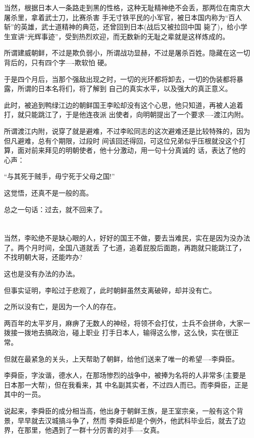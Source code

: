 \documentclass[11pt,a4paper,onecolumn]{article}
\begin{document}
当然，根据日本人一条路走到黑的性格，这种无耻精神绝不会丢，那两位在南京大屠杀里，拿着武士刀，比赛杀害
手无寸铁平民的小军官，被日本国内称为``百人斩''的英雄，武士道精神的典范，还曾回到日本(战后又被拉回中国
毙了)，给小学生宣讲``光辉事迹''，受到热烈欢迎，而无数新的无耻之辈就是这样炼成的。

所谓建威朝鲜，不过是欺负弱小，所谓战功显赫，不过是屠杀百姓。隐藏在这一切背后的，只有四个字----欺软怕
硬。

于是四个月后，当那个强敌出现之时，一切的光环都将卸去，一切的伪装都将暴露，所谓的日本名将们，将了解到
自己的真实水平，以及强大的真正意义。

此时，被追到鸭绿江边的朝鲜国王李昖却没有这个心思，他只知道，再被人追着打，就只能跳江了，于是他连夜派
出使者，向明朝提出了一个要求----渡江内附。

所谓渡江内附，说穿了就是避难，不过李昖同志的这次避难还是比较特殊的，因为但凡避难，总有个期限，过段时
间该回还得回，可这位兄弟似乎压根就没这个打算，面对前来拜见的明朝使者，他十分激动，用一句十分真诚的
话，表达了他的心声：

``与其死于贼手，毋宁死于父母之国!''

这觉悟，还真不是一般的高。

总之一句话：过去，就不回来了。

\section[\thesection]{}

当然，李昖绝不是缺心眼的人，好好的国王不做，要去当难民，实在是因为没办法了。两个月时间，全国八道就丢
了七道，追着屁股后面跑，再跑就只能跳江了，不找明朝大哥，还能咋办?

这也是没有办法的办法。

但事实证明，李昖过于悲观了，此时朝鲜虽然支离破碎，却并没有亡。

之所以没有亡，是因为一个人的存在。

两百年的太平岁月，麻痹了无数人的神经，将领不会打仗，士兵不会拼命，大家一拨接一拨地去搞政治，碰上职业
打手日本人，输得这么惨，这么快，实在很正常。

但就在最紧急的关头，上天帮助了朝鲜，给他们送来了唯一的希望----李舜臣。

李舜臣，字汝谐，德水人，在那场惨烈的战争中，被捧为名将的人非常多(主要是日本那一大帮)，但在我看来，其
中名副其实者，不过四人而已。而李舜臣，正是其中的一员。

说起来，李舜臣的成分相当高，他出身于朝鲜王族，是王室宗亲，一般有这个背景，早早就去汉城搞斗争了，然而
李舜臣却是个例外，他武科毕业后，就去了边界，在那里，他遇到了一群十分厉害的对手----女真。
\end{document}
